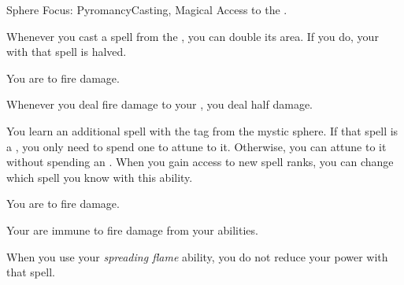     \begin{feat}{Sphere Focus: Pyromancy}{Casting, Magical}
        \featpre Access to the  .

         Whenever you cast a spell from the  , you can double its area.
        If you do, your  with that spell is halved.

         You are  to fire damage.

         Whenever you deal fire damage to your , you deal half damage.

         You learn an additional spell with the  tag from the  mystic sphere.
        If that spell is a , you only need to spend one  to attune to it.
        Otherwise, you can attune to it without spending an .
        When you gain access to new spell ranks, you can change which spell you know with this ability.

         You are  to fire damage.

         Your  are immune to fire damage from your abilities.

         When you use your \textit{spreading flame} ability, you do not reduce your power with that spell.
    \end{feat}

